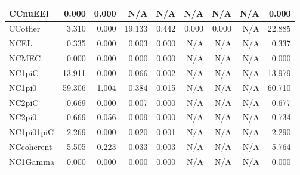 \begin{table}
\begin{adjustbox}{width=1\textwidth}
\begin{tabular} {l r r r r r r r r}
        \\ \hline
 CCnuEEl      & 0.000                & 0.000                & N/A                  & N/A                  & N/A                  & N/A                  & N/A                  & 0.000        
        \\ \hline
 CCother      & 3.310                & 0.000                & 19.133               & 0.442                & 0.000                & 0.000                & N/A                  & 22.885       
        \\ \hline
 NCEL         & 0.335                & 0.000                & 0.003                & 0.000                & N/A                  & N/A                  & N/A                  & 0.337        
        \\ \hline
 NCMEC        & 0.000                & 0.000                & 0.000                & 0.000                & N/A                  & N/A                  & N/A                  & 0.000        
        \\ \hline
 NC1piC       & 13.911               & 0.000                & 0.066                & 0.002                & N/A                  & N/A                  & N/A                  & 13.979       
        \\ \hline
 NC1pi0       & 59.306               & 1.004                & 0.384                & 0.015                & N/A                  & N/A                  & N/A                  & 60.710       
        \\ \hline
 NC2piC       & 0.669                & 0.000                & 0.007                & 0.000                & N/A                  & N/A                  & N/A                  & 0.677        
        \\ \hline
 NC2pi0       & 0.669                & 0.056                & 0.009                & 0.000                & N/A                  & N/A                  & N/A                  & 0.734        
        \\ \hline
 NC1pi01piC   & 2.269                & 0.000                & 0.020                & 0.001                & N/A                  & N/A                  & N/A                  & 2.290        
        \\ \hline
 NCcoherent   & 5.505                & 0.223                & 0.033                & 0.003                & N/A                  & N/A                  & N/A                  & 5.764        
        \\ \hline
 NC1Gamma     & 0.000                & 0.000                & 0.000                & 0.000                & N/A                  & N/A                  & N/A                  & 0.000        

\end{tabular}
\end{adjustbox}
\end{table}
